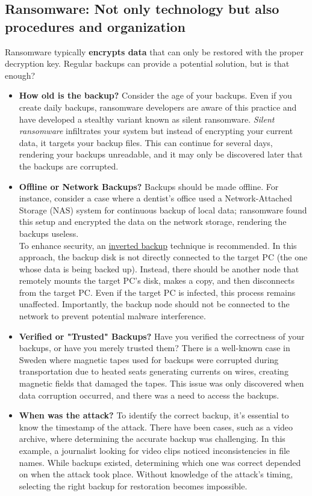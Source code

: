 \subsection{Ransomware: Not only technology but also procedures and organization}
Ransomware typically \textbf{encrypts data} that can only be restored with the proper decryption key. Regular backups can provide a potential solution, but is that enough?
\begin{itemize}
  \item \textbf{How old is the backup?} Consider the age of your backups. Even if you create daily backups, ransomware developers are aware of this practice and have developed a stealthy variant known as silent ransomware. \emph{Silent ransomware} infiltrates your system but instead of encrypting your current data, it targets your backup files. This can continue for several days, rendering your backups unreadable, and it may only be discovered later that the backups are corrupted.
  \item \textbf{Offline or Network Backups?} Backups should be made offline. For instance, consider a case where a dentist's office used a Network-Attached Storage (NAS) system for continuous backup of local data; ransomware found this setup and encrypted the data on the network storage, rendering the backups useless.\\
        To enhance security, an \ul{inverted backup} technique is recommended. In this approach, the backup disk is not directly connected to the target PC (the one whose data is being backed up). Instead, there should be another node that remotely mounts the target PC's disk, makes a copy, and then disconnects from the target PC. Even if the target PC is infected, this process remains unaffected. Importantly, the backup node should not be connected to the network to prevent potential malware interference.
  \item \textbf{Verified or "Trusted" Backups?} Have you verified the correctness of your backups, or have you merely trusted them? There is a well-known case in Sweden where magnetic tapes used for backups were corrupted during transportation due to heated seats generating currents on wires, creating magnetic fields that damaged the tapes. This issue was only discovered when data corruption occurred, and there was a need to access the backups.
  \item \textbf{When was the attack?} To identify the correct backup, it's essential to know the timestamp of the attack. There have been cases, such as a video archive, where determining the accurate backup was challenging. In this example, a journalist looking for video clips noticed inconsistencies in file names. While backups existed, determining which one was correct depended on when the attack took place. Without knowledge of the attack's timing, selecting the right backup for restoration becomes impossible.
\end{itemize}



